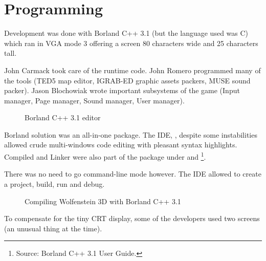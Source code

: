 \documentclass[book.tex]{subfiles}
\begin{document}
\section{Programming}



Development was done with Borland C++ 3.1 (but the language used was C) which ran in VGA mode 3 offering a screen 80 characters wide and 25 characters tall.\\
\par
John Carmack took care of the runtime code. John Romero programmed many of the tools (TED5 map editor, IGRAB-ED graphic assets packers, MUSE sound packer). Jason Blochowiak wrote important subsystems of the game (Input manager, Page manager, Sound manager, User manager).\\

\begin{figure}[H]
\centering
\caption{Borland C++ 3.1 editor}
\end{figure}
\par
Borland solution was an all-in-one package. The IDE, , despite some instabilities allowed crude multi-windows code editing with pleasant syntax highlights. Compiled and Linker were also part of the package under \cw{} and \footnote{Source: Borland C++ 3.1 User Guide.}.
\pagebreak


There was no need to go command-line mode however. The IDE allowed to create a project, build, run and debug.\\
\par
\begin{figure}[H]
\centering
  \caption{Compiling Wolfenstein 3D with Borland C++ 3.1}
\end{figure}





To compensate for the tiny CRT display, some of the developers used two screens (an unusual thing at the time).\\
\end{document}
